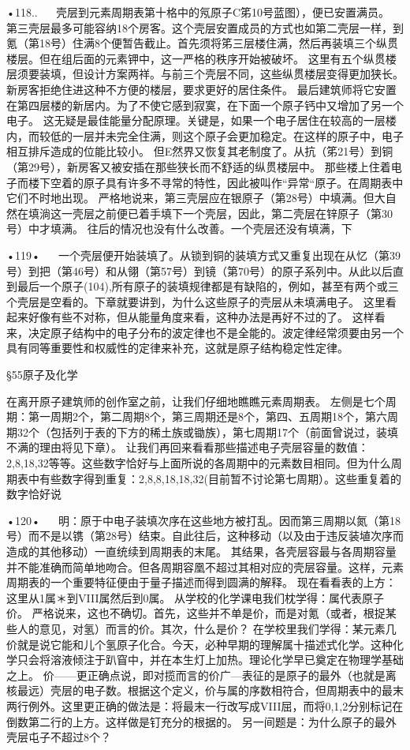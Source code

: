 •118..
  
壳层到元素周期表第十格中的氖原子C笫10号蓝图），便已安置满员。
第三壳层最多可能容纳18个房客。这个壳层安置成员的方式也如第二壳层一样，到氪（第18号）住满8个便暂告截止。首先须将笫三层楼住满，然后再装填三个纵贯楼层。但在组后面的元素钾中，这一严格的秩序开始被破坏。
这里有五个纵贯楼层须要装填，但设计方案两祥。与前三个壳层不同，这些纵贯楼层变得更加狭长。新房客拒绝住进这种不方便的楼层，要求更好的居住条件。
最后建筑师将它安置在第四层楼的新居内。为了不使它感到寂寞，在下面一个原子钙中又增加了另一个电子。
这无疑是最佳能量分配原理。关键是，如果一个电子居住在较高的一层楼内，而较低的一层并未完全住满，则这个原子会更加稳定。在这样的原子中，电子相互排斥造成的位能比较小。
但E然界又恢复其老制度了。从抗（笫21号）到铜（第29号），新房客又被安插在那些狭长而不舒适的纵贯楼层中。
那些楼上住着电子而楼下空着的原子具有许多不寻常的特性，因此被叫作“异常“原子。在周期表中它们不时地出现。
严格地说来，第三壳层应在银原子（第28号）中填满。但大自然在填淌这一壳层之前便已着手填下一个壳层，因此，第二壳层在锌原子（第30号）中才填满。
往后的情况也没有什么改善。一个壳层还没有填满，下

•119•
  
一个壳层便开始装填了。从锁到铜的装填方式又重复出现在从忆（第39号）到把（第46号）和从翎（第57号）到镜（第70号）的原子系列中。从此以后直到最后一个原子(104),所有原子的装填规律都是有缺陷的，例如，甚至有两个或三个壳层是空看的。下章就要讲到，为什么这些原子的壳层从未填满电子。
这里看起来好像有些不对称，但从能量角度来看，这种办法是再好不过的了。
这样看来，决定原子结构中的电子分布的波定律也不是全能的。波定律经常须要由另一个具有同等重要性和权威性的定律来补充，这就是原子结构稳定性定律。

§55原子及化学

在离开原子建筑师的创作室之前，让我们仔细地瞧瞧元素周期表。
左侧是七个周期：第一周期2个，第二周期8个，第三周期还是8个，第四、五周期18个，第六周期32个（包括列于表的下方的稀土族或锄族），第七周期17个（前面曾说过，装填不满的理由将见下章）。
让我们再回来看看那些描述电子壳层容量的数值：2,8,18,32等等。这些数字恰好与上面所说的各周期中的元素数目相同。但为什么周期表中有些数字得到重复：2,8,8,18,18,32(目前暂不讨论第七周期）。这些重复着的数字恰好说

•120•
  
明：原于中电子装填次序在这些地方被打乱。因而第三周期以氮（第18号）而不是以镌（第28号）结束。自此往后，这种移动（以及由于违反装埴次序而造成的其他移动）一直统续到周期表的末尾。
其结果，各壳层容最与各周期容量并不能准确而简单地吻合。但各周期容凰不超过其相对应的壳层容量。这样，元素周期表的一个重要特征便由于量子描述而得到圆满的解释。
现在看看表的上方：这里从1属＊到VIII属然后到0属。
从学校的化学课电我们枕学得：属代表原子价。
严格说来，这也不确切。首先，这些并不单是价，而是对氪（或者，根捉某些人的意见，对氢）而言的价。其次，什么是价？
在学校里我们学得：某元素几价就是说它能和儿个氢原子化合。今天，必种早期的理解属十描述式化学。这种化学只会将溶液倾注于趴窅中，并在本生灯上加热。理论化学早已奠定在物理学基础之上。
价——更正确点说，即对揽而言的价广—表征的是原子的最外（也就是离核最远）壳层的电子数。根据这个定义，价与属的序数相符合，但周期表中的最末两行例外。这里更正确的做法是：将最末一行改写成VIII屈，而将0,1,2分别标记在倒数第二行的上方。这样做是钉充分的根据的。
另一间题是：为什么原子的最外壳层屯子不超过8个？

